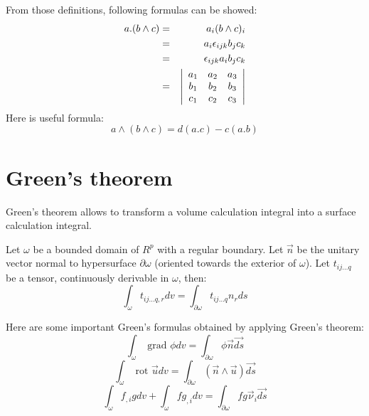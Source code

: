 \documentclass[12pt]{book}
\begin{document}
From those definitions, following formulas can be showed:
\begin{eqnarray}
a.(b \wedge c)&=&a_i(b\wedge c)_i\\
&=&a_i\epsilon_{ijk}b_jc_k\\
&=&\epsilon_{ijk}a_ib_jc_k\\
&=&\left|\begin{array}{ccc}a_1&a_2&a_3\cr
b_1&b_2&b_3\cr
c_1&c_2&c_3\cr
\end{array} \right|
\end{eqnarray}
Here is useful formula:
\begin{equation}
a\wedge (b\wedge c)=d(a.c)-c(a.b)
\end{equation}




\section{Green's theorem}\label{secappendgreeneq}
Green's theorem allows to transform a volume calculation integral into a
surface calculation integral.
\begin{thm}
Let $\omega$ be a bounded domain of $R^p$ with a regular boundary. Let $\vec
n$ be the unitary vector normal to hypersurface $\partial \omega$
(oriented towards the exterior of $\omega$). Let $t_{ij\dots q}$ be a tensor,
continuously derivable in $\omega$, then:
\begin{equation}
\int_{\omega}t_{ij\dots q,r}dv=\int_{\partial\omega}t_{ij\dots q}n_r ds
\end{equation}
\end{thm}
Here are some important Green's formulas obtained by applying Green's theorem:
\begin{equation}
\int_{\omega}\mbox{ grad }\phi dv=\int_{\partial\omega}\phi \vec n\vec{ds}
\end{equation}
\begin{equation}
\int_{\omega}\mbox{ rot }\vec{u}dv=\int_{\partial\omega}(\vec{n}\wedge\vec{u})\vec{ds}
\end{equation}
\begin{equation}
\int_{\omega}f_{,i}gdv+\int_{\omega}fg_{,i}dv=\int_{\partial\omega}
fg\vec{\nu}_i\vec{ds} 
\end{equation}
\end{document}
